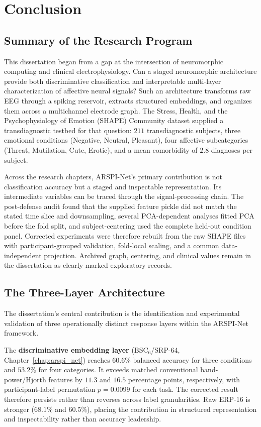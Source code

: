 \chapter{Conclusion}
\label{chap:conclusion}

\section{Summary of the Research Program}

This dissertation began from a gap at the intersection of neuromorphic computing and clinical electrophysiology. Can a staged neuromorphic architecture provide both discriminative classification and interpretable multi-layer characterization of affective neural signals? Such an architecture transforms raw EEG through a spiking reservoir, extracts structured embeddings, and organizes them across a multichannel electrode graph. The Stress, Health, and the Psychophysiology of Emotion (SHAPE) Community dataset \cite{noauthor_shape_2018} supplied a transdiagnostic testbed for that question: $211$ transdiagnostic subjects, three emotional conditions (Negative, Neutral, Pleasant), four affective subcategories (Threat, Mutilation, Cute, Erotic), and a mean comorbidity of $2.8$ diagnoses per subject.

Across the research chapters, ARSPI-Net's primary contribution is not classification accuracy but a staged and inspectable representation. Its intermediate variables can be traced through the signal-processing chain. The post-defense audit found that the supplied feature pickle did not match the stated time slice and downsampling, several PCA-dependent analyses fitted PCA before the fold split, and subject-centering used the complete held-out condition panel. Corrected experiments were therefore rebuilt from the raw SHAPE files with participant-grouped validation, fold-local scaling, and a common data-independent projection. Archived graph, centering, and clinical values remain in the dissertation as clearly marked exploratory records.


\section{The Three-Layer Architecture}

The dissertation's central contribution is the identification and experimental validation of three operationally distinct response layers within the ARSPI-Net framework.

The \textbf{discriminative embedding layer} (BSC$_6$/SRP-64, Chapter~\ref{chap:arspi_net}) reaches $60.6\%$ balanced accuracy for three conditions and $53.2\%$ for four categories. It exceeds matched conventional band-power/Hjorth features by $11.3$ and $16.5$ percentage points, respectively, with participant-label permutation $p=0.0099$ for each task. The corrected result therefore persists rather than reverses across label granularities. Raw ERP-16 is stronger ($68.1\%$ and $60.5\%$), placing the contribution in structured representation and inspectability rather than accuracy leadership.

